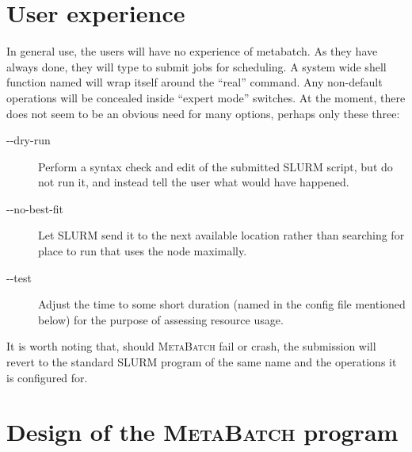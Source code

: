 \documentclass[11pt,letterpaper,portrait]{article}
\providecommand{\MB}{{\fontfamily{pzc}\selectfont \Large M\textsc{eta}B\textsc{atch}}\xspace}
\begin{document}
\section{User experience}

In general use, the users will have no experience of metabatch. As
they have always done, they will type 
to submit jobs for scheduling. A system wide shell function named
 will wrap itself around the ``real'' 
command. Any non-default operations will be concealed inside ``expert
mode'' switches. At the moment, there does not seem to be an obvious
need for many options, perhaps only these three:

\begin{description}
\item[-{-}dry-run] Perform a syntax check and edit of the submitted
SLURM script, but do not run it, and instead tell the user what
would have happened. 

\item[-{-}no-best-fit] Let SLURM send it to the next available
location rather than searching for place to run that uses the node
maximally.

\item[-{-}test] Adjust the time to some short duration (named in
the config file mentioned below) for the purpose of assessing
resource usage.

\end{description} 

It is worth noting that, should \MB fail or crash, the  
submission will revert to the standard SLURM program of the same
name and the operations it is configured for. 

\section{Design of the \MB program}
\end{document}
